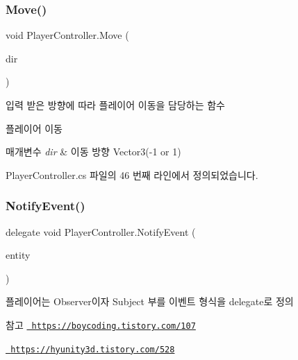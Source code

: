 \subsubsection{\texorpdfstring{Move()}{Move()}}
{\footnotesize\ttfamily void Player\+Controller.\+Move (\begin{DoxyParamCaption}\item[{Vector3}]{dir }\end{DoxyParamCaption})}



입력 받은 방향에 따라 플레이어 이동을 담당하는 함수 

플레이어 이동 
\begin{DoxyParams}{매개변수}
{\em dir} & 이동 방향 Vector3(-\/1 or 1) \\
\hline
\end{DoxyParams}


Player\+Controller.\+cs 파일의 46 번째 라인에서 정의되었습니다.


\begin{DoxyCode}{0}

\end{DoxyCode}
\mbox{\label{class_player_controller_a934c7f80b80276620cd60eaaeea7520e}} 
\subsubsection{\texorpdfstring{NotifyEvent()}{NotifyEvent()}}
{\footnotesize\ttfamily delegate void Player\+Controller.\+Notify\+Event (\begin{DoxyParamCaption}\item[{Game\+Object}]{entity }\end{DoxyParamCaption})}



플레이어는 Observer이자 Subject 부를 이벤트 형식을 delegate로 정의 

\begin{DoxySeeAlso}{참고}
\href{https://boycoding.tistory.com/107}{\texttt{ https\+://boycoding.\+tistory.\+com/107}} 

\href{https://hyunity3d.tistory.com/528}{\texttt{ https\+://hyunity3d.\+tistory.\+com/528}} 
\end{DoxySeeAlso}
\mbox{\label{class_player_controller_ae1117d9c4da3193181cddad2c814e467}} 
